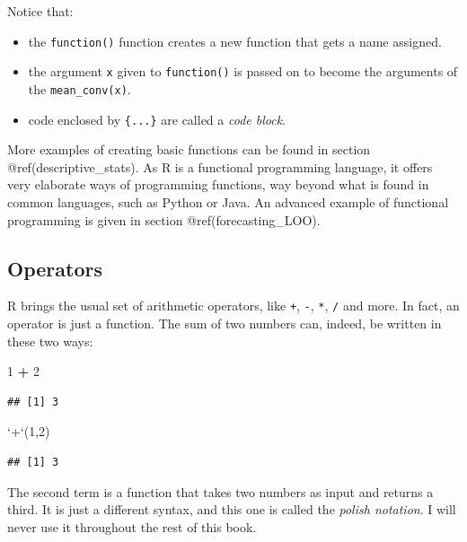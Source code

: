 \documentclass[]{svmono}
\newenvironment{Shaded}{\begin{snugshade}}{\end{snugshade}}
\newcommand{\DataTypeTok}[1]{\textcolor[rgb]{0.13,0.29,0.53}{#1}}
\newcommand{\DecValTok}[1]{\textcolor[rgb]{0.00,0.00,0.81}{#1}}
\newcommand{\StringTok}[1]{\textcolor[rgb]{0.31,0.60,0.02}{#1}}
\newcommand{\OperatorTok}[1]{\textcolor[rgb]{0.81,0.36,0.00}{\textbf{#1}}}
\newcommand{\NormalTok}[1]{#1}
\providecommand{\tightlist}{%
  \setlength{\itemsep}{0pt}\setlength{\parskip}{0pt}}
\begin{document}
Notice that:

\begin{itemize}
\tightlist
\item
  the \texttt{function()} function creates a new function that gets a
  name assigned.
\item
  the argument \texttt{x} given to \texttt{function()} is passed on to
  become the arguments of the \texttt{mean\_conv(x)}.
\item
  code enclosed by \texttt{\{...\}} are called a \emph{code block}.
\end{itemize}

More examples of creating basic functions can be found in section
@ref(descriptive\_stats). As R is a functional programming language, it
offers very elaborate ways of programming functions, way beyond what is
found in common languages, such as Python or Java. An advanced example
of functional programming is given in section @ref(forecasting\_LOO).

\subsection{Operators}\label{operators}

R brings the usual set of arithmetic operators, like \texttt{+},
\texttt{-}, \texttt{*}, \texttt{/} and more. In fact, an operator is
just a function. The sum of two numbers can, indeed, be written in these
two ways:

\begin{Shaded}
\begin{Highlighting}[]
\DecValTok{1} \OperatorTok{+}\StringTok{ }\DecValTok{2}
\end{Highlighting}
\end{Shaded}

\begin{verbatim}
## [1] 3
\end{verbatim}

\begin{Shaded}
\begin{Highlighting}[]
\StringTok{`}\DataTypeTok{+}\StringTok{`}\NormalTok{(}\DecValTok{1}\NormalTok{,}\DecValTok{2}\NormalTok{)}
\end{Highlighting}
\end{Shaded}

\begin{verbatim}
## [1] 3
\end{verbatim}

The second term is a function that takes two numbers as input and
returns a third. It is just a different syntax, and this one is called
the \emph{polish notation}. I will never use it throughout the rest of
this book.
\end{document}
